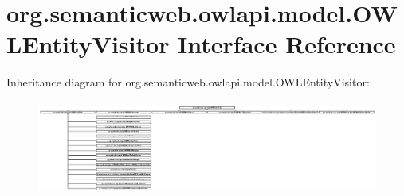 \hypertarget{interfaceorg_1_1semanticweb_1_1owlapi_1_1model_1_1_o_w_l_entity_visitor}{\section{org.\-semanticweb.\-owlapi.\-model.\-O\-W\-L\-Entity\-Visitor Interface Reference}
\label{interfaceorg_1_1semanticweb_1_1owlapi_1_1model_1_1_o_w_l_entity_visitor}
}
Inheritance diagram for org.\-semanticweb.\-owlapi.\-model.\-O\-W\-L\-Entity\-Visitor\-:\begin{figure}[H]
\begin{center}
\leavevmode
\includegraphics[height=3.111111cm]{interfaceorg_1_1semanticweb_1_1owlapi_1_1model_1_1_o_w_l_entity_visitor}
\end{center}
\end{figure}
